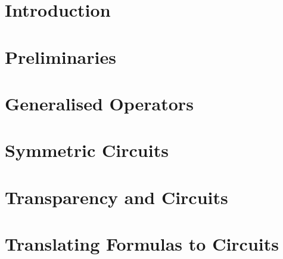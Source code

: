\documentclass[a4paper,10pt,numbered,print,index]{../classes/PhDThesisPSnPDF}
\begin{document}
\frontmatter

\maketitle







\tableofcontents





\mainmatter
\chapter{Introduction} %


\chapter{Preliminaries} %


\chapter{Generalised Operators} %


\chapter{Symmetric Circuits} %


\chapter{Transparency and Circuits} %
\label{chpt:algorithms}


\chapter{Translating Formulas to Circuits} %
\label{chpt:formulas-to-circuits}

\end{document}
